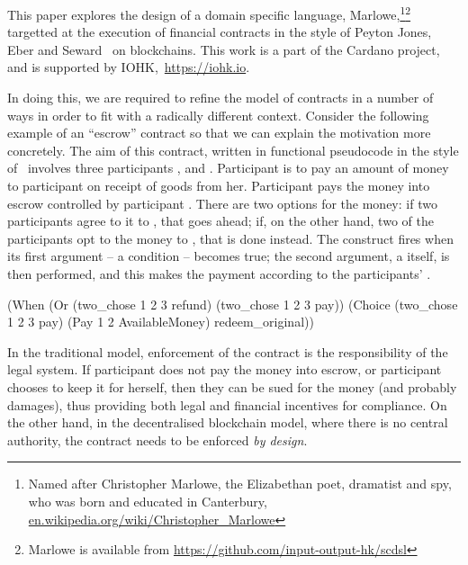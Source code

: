 \documentclass[runningheads]{llncs}
\begin{document}
This paper explores the design of a domain specific language, Marlowe,\footnote{Named after Christopher 
Marlowe, the Elizabethan poet, dramatist and spy, who was born and educated in Canterbury,  \url{en.wikipedia.org/wiki/Christopher_Marlowe}}\footnote{Marlowe is available 
from \url{https://github.com/input-output-hk/scdsl}} targetted at the execution of financial contracts in the style of 
Peyton Jones, Eber and Seward~\cite{PeytonJones:2000} on blockchains. This work is a part of the Cardano project, and is 
supported by IOHK,~\url{https://iohk.io}.

In doing this, we are required to refine the model of contracts in a number of ways in order to fit with a radically 
different context. Consider the following example of an ``escrow'' contract so that we can explain the motivation 
more concretely. The aim of this contract, written in functional pseudocode in the style of~\cite{PeytonJones:2000} 
involves three participants ,  and . Participant  is 
to pay an amount of money to participant  on receipt of goods from her. Participant  
pays the money into escrow controlled by participant . There are two options for the money: if two 
participants agree to  it to , that goes ahead; if, on the other hand, two of the 
participants opt to  the money to , that is done instead. The 
 construct fires when its first argument -- a condition -- becomes true; the second argument, a 
 itself, is then performed, and this makes the payment according to the participants' 
.

\begin{haskellcode}
(When (Or (two_chose 1 2 3 refund)
          (two_chose 1 2 3 pay))
      (Choice (two_chose 1 2 3 pay)
              (Pay 1 2 AvailableMoney)
              redeem_original))
\end{haskellcode}

In the traditional model, enforcement of the contract is the responsibility of the legal system. If participant 
 does not pay the money into escrow, or participant  chooses to keep it for herself, 
then they can be sued for the money (and probably damages), thus providing both legal and 
financial incentives for compliance. On the other hand, in the decentralised blockchain model, where there is no central 
authority, the contract needs to be enforced \emph{by design}. 
\end{document}
